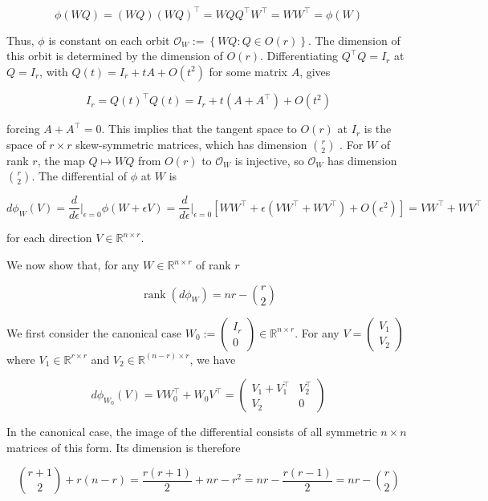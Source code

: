 \documentclass{article}
\begin{document}
\[
\phi(W Q) = (WQ) (WQ)^{\top} = WQQ^{\top} W^{\top} = WW^{\top} = \phi(W)
\]

Thus, $\phi$ is constant on each orbit $\mathcal{O}_W := \left\{ WQ: Q \in O(r)\right\}$. The dimension of this orbit is determined by the dimension of $O(r)$. Differentiating $Q^{\top}Q = I_r$ at $Q = I_r$, with $Q(t) = I_r + tA + O(t^2)$ for some matrix $A$, gives

\[
I_r = Q(t)^{\top} Q(t) = I_r + t(A + A^{\top}) + O(t^2)
\]

forcing $A + A^{\top} = 0$. This implies that the tangent space to $O(r)$ at $I_r$ is the space of $r \times r$ skew-symmetric matrices, which has dimension $\binom{r}{2}$ . For $W$ of rank $r$, the map $Q \mapsto WQ$ from $O(r)$ to $\mathcal{O}_W$ is injective, so $\mathcal{O}_W$ has dimension $\binom{r}{2}$. The differential of $\phi$ at $W$ is

\[
d \phi_W(V) = \frac{d}{d\epsilon} \Biggr\vert_{\epsilon=0} \phi(W + \epsilon V) = \frac{d}{d\epsilon}\Biggr\vert_{\epsilon=0} \left[ WW^{\top} + \epsilon (VW^{\top} + WV^{\top}) + O(\epsilon^2) \right] = VW^{\top} + WV^{\top}
\]

for each direction $V \in \mathbb{R}^{n\times r}$. 

We now show that, for any $W \in \mathbb{R}^{n \times r}$ of rank $r$

\[
\operatorname{rank}(d \phi_W) = nr - \binom{r}{2}
\]


We first consider the canonical case $W_0 := \begin{pmatrix} I_r \\ 0 \end{pmatrix} \in \mathbb{R}^{n\times r}$. For any $V = \begin{pmatrix} V_1 \\ V_2 \end{pmatrix}$ where $V_1 \in \mathbb{R}^{r\times r}$ and $V_2 \in \mathbb{R}^{(n-r) \times r}$, we have

\[
d \phi_{W_0}(V) = V W_0^{\top} + W_0 V^{\top} = \begin{pmatrix} V_1 + V_1^{\top} & V_2^{\top} \\ V_2 & 0 \end{pmatrix}
\]

In the canonical case, the image of the differential consists of all symmetric $n \times n$ matrices of this form. Its dimension is therefore

\[
\binom{r+1}{2} + r(n-r) = \frac{r(r+1)}{2} +nr - r^2 = nr - \frac{r(r-1)}{2} = nr - \binom{r}{2}
\]
\end{document}
